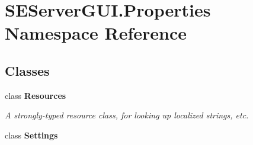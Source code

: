 \hypertarget{namespace_s_e_server_g_u_i_1_1_properties}{}\section{S\+E\+Server\+G\+U\+I.\+Properties Namespace Reference}
\label{namespace_s_e_server_g_u_i_1_1_properties}
\subsection*{Classes}
\begin{DoxyCompactItemize}
\item 
class {\bfseries Resources}
\begin{DoxyCompactList}\small\item\em A strongly-\/typed resource class, for looking up localized strings, etc. \end{DoxyCompactList}\item 
class {\bfseries Settings}
\end{DoxyCompactItemize}
